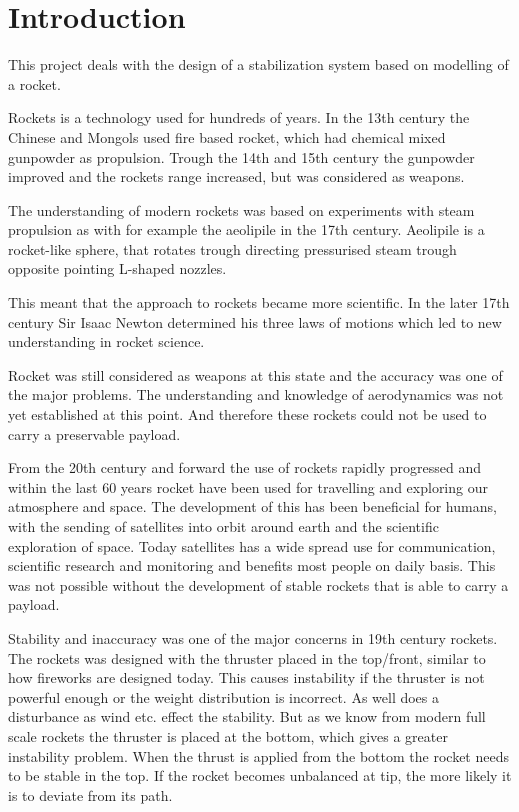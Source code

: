 \chapter{Introduction}
This project deals with the design of a stabilization system based on modelling of a rocket.

Rockets is a technology used for hundreds of years. In the 13th century the Chinese and Mongols used fire based rocket, which had chemical mixed gunpowder as propulsion. Trough the 14th and 15th century the gunpowder improved and the rockets range increased, but was considered as weapons.  

The understanding of modern rockets was based on experiments with steam propulsion as with for example the aeolipile in the 17th century. Aeolipile is a rocket-like sphere, that rotates trough directing pressurised steam trough opposite pointing L-shaped nozzles. 

This meant that the approach to rockets became more scientific. In the later 17th century Sir Isaac Newton determined his three laws of motions which led to new understanding in rocket science.

Rocket was still considered as weapons at this state and the accuracy was one of the major problems. The understanding and knowledge of aerodynamics was not yet established at this point. And therefore these rockets could not be used to carry a preservable payload. 


From the 20th century and forward the use of rockets rapidly progressed and within the last 60 years rocket have been used for travelling and exploring our atmosphere and space. The development of this has been beneficial for humans, with the sending of satellites into orbit around earth and the scientific exploration of space. Today satellites has a wide spread use for communication, scientific research and monitoring and benefits most people on daily basis. This was not possible without the development of stable rockets that is able to carry a payload.   

Stability and inaccuracy was one of the major concerns in 19th century rockets. The rockets was designed with the thruster placed in the top/front, similar to how fireworks are designed today. This causes instability if the thruster is not powerful enough or the weight distribution is incorrect. As well does a disturbance as wind etc. effect the stability. But as we know from modern full scale rockets the thruster is placed at the bottom, which gives a greater instability problem. When the thrust is applied from the bottom the rocket needs to be stable in the top. If the rocket becomes unbalanced at tip, the more likely it is to deviate from its path.  



